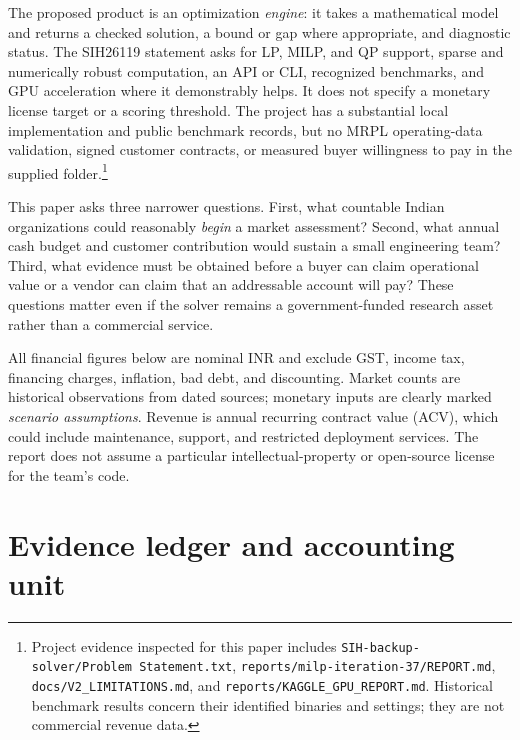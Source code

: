 \documentclass[11pt,a4paper]{article}
\begin{document}
The proposed product is an optimization \emph{engine}: it takes a mathematical model and returns a checked solution, a bound or gap where appropriate, and diagnostic status. The SIH26119 statement asks for LP, MILP, and QP support, sparse and numerically robust computation, an API or CLI, recognized benchmarks, and GPU acceleration where it demonstrably helps. It does not specify a monetary license target or a scoring threshold. The project has a substantial local implementation and public benchmark records, but no MRPL operating-data validation, signed customer contracts, or measured buyer willingness to pay in the supplied folder.\footnote{Project evidence inspected for this paper includes \texttt{SIH-backup-solver/Problem Statement.txt}, \texttt{reports/milp-iteration-37/REPORT.md}, \texttt{docs/V2\_LIMITATIONS.md}, and \texttt{reports/KAGGLE\_GPU\_REPORT.md}. Historical benchmark results concern their identified binaries and settings; they are not commercial revenue data.}

This paper asks three narrower questions. First, what countable Indian organizations could reasonably \emph{begin} a market assessment? Second, what annual cash budget and customer contribution would sustain a small engineering team? Third, what evidence must be obtained before a buyer can claim operational value or a vendor can claim that an addressable account will pay? These questions matter even if the solver remains a government-funded research asset rather than a commercial service.

All financial figures below are nominal INR and exclude GST, income tax, financing charges, inflation, bad debt, and discounting. Market counts are historical observations from dated sources; monetary inputs are clearly marked \emph{scenario assumptions}. Revenue is annual recurring contract value (ACV), which could include maintenance, support, and restricted deployment services. The report does not assume a particular intellectual-property or open-source license for the team's code.

\section{Evidence ledger and accounting unit}
\end{document}
